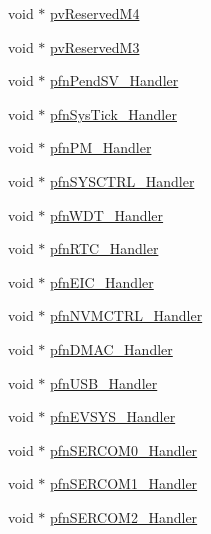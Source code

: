 \begin{DoxyCompactItemize}
void $\ast$ \mbox{\hyperlink{struct___device_vectors_aff08add020ed7612bf4cb170bf47a34a}{pv\+Reserved\+M4}}
\item 
void $\ast$ \mbox{\hyperlink{struct___device_vectors_a7c5011bc9c6583d87775e2378dc0fd99}{pv\+Reserved\+M3}}
\item 
void $\ast$ \mbox{\hyperlink{struct___device_vectors_a1fd18a996eb025c6eb0b532c87c30c45}{pfn\+Pend\+S\+V\+\_\+\+Handler}}
\item 
void $\ast$ \mbox{\hyperlink{struct___device_vectors_a55976020674615bfacf5c43ec6f65d87}{pfn\+Sys\+Tick\+\_\+\+Handler}}
\item 
void $\ast$ \mbox{\hyperlink{struct___device_vectors_a13e5fe42cf90f6f8a77d39574f4a2621}{pfn\+P\+M\+\_\+\+Handler}}
\item 
void $\ast$ \mbox{\hyperlink{struct___device_vectors_a8a6224e77ddde7157e43a9530f9f308b}{pfn\+S\+Y\+S\+C\+T\+R\+L\+\_\+\+Handler}}
\item 
void $\ast$ \mbox{\hyperlink{struct___device_vectors_a22f1268ba3045ef100eeb6a2256865a4}{pfn\+W\+D\+T\+\_\+\+Handler}}
\item 
void $\ast$ \mbox{\hyperlink{struct___device_vectors_a0168eefd9e5dc449d2f346fbba35f3e1}{pfn\+R\+T\+C\+\_\+\+Handler}}
\item 
void $\ast$ \mbox{\hyperlink{struct___device_vectors_a759becc3319c6c3a7a05f0d7f5700745}{pfn\+E\+I\+C\+\_\+\+Handler}}
\item 
void $\ast$ \mbox{\hyperlink{struct___device_vectors_aa6a80462774679f2e1991e3fc7cd6458}{pfn\+N\+V\+M\+C\+T\+R\+L\+\_\+\+Handler}}
\item 
void $\ast$ \mbox{\hyperlink{struct___device_vectors_adac1b36c6beb383a9ceb7fc8a4276940}{pfn\+D\+M\+A\+C\+\_\+\+Handler}}
\item 
void $\ast$ \mbox{\hyperlink{struct___device_vectors_a206c69cb93ff5f285babe0f53916b480}{pfn\+U\+S\+B\+\_\+\+Handler}}
\item 
void $\ast$ \mbox{\hyperlink{struct___device_vectors_a1f17fb447c3f5b548a5638cf4d587c33}{pfn\+E\+V\+S\+Y\+S\+\_\+\+Handler}}
\item 
void $\ast$ \mbox{\hyperlink{struct___device_vectors_a6db46e8546e2a84f8130831f7025e1cb}{pfn\+S\+E\+R\+C\+O\+M0\+\_\+\+Handler}}
\item 
void $\ast$ \mbox{\hyperlink{struct___device_vectors_af8fdc19a2df0efaa2bea405225917e58}{pfn\+S\+E\+R\+C\+O\+M1\+\_\+\+Handler}}
\item 
void $\ast$ \mbox{\hyperlink{struct___device_vectors_a008fb8048ff74ce1125a5a74f190e526}{pfn\+S\+E\+R\+C\+O\+M2\+\_\+\+Handler}}

\end{DoxyCompactItemize}
